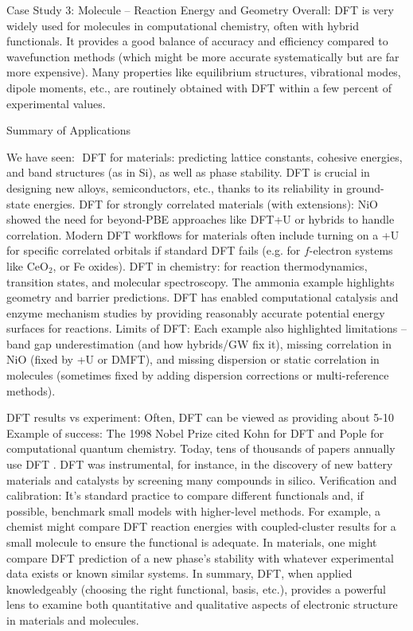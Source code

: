 \begin{frame}{Case Study 3: Molecule – Reaction Energy and Geometry}
Overall: DFT is very widely used for molecules in computational chemistry, often with hybrid functionals. It provides a good balance of accuracy and efficiency compared to wavefunction methods (which might be more accurate systematically but are far more expensive). Many properties like equilibrium structures, vibrational modes, dipole moments, etc., are routinely obtained with DFT within a few percent of experimental values. \end{frame}


\begin{frame}{Summary of Applications}

We have seen: 
DFT for materials: predicting lattice constants, cohesive energies, and band structures (as in Si), as well as phase stability. DFT is crucial in designing new alloys, semiconductors, etc., thanks to its reliability in ground-state energies.
DFT for strongly correlated materials (with extensions): NiO showed the need for beyond-PBE approaches like DFT+U or hybrids to handle correlation. Modern DFT workflows for materials often include turning on a +U for specific correlated orbitals if standard DFT fails (e.g. for $f$-electron systems like CeO$_2$, or Fe oxides).
DFT in chemistry: for reaction thermodynamics, transition states, and molecular spectroscopy. The ammonia example highlights geometry and barrier predictions. DFT has enabled computational catalysis and enzyme mechanism studies by providing reasonably accurate potential energy surfaces for reactions.
Limits of DFT: Each example also highlighted limitations – band gap underestimation (and how hybrids/GW fix it), missing correlation in NiO (fixed by +U or DMFT), and missing dispersion or static correlation in molecules (sometimes fixed by adding dispersion corrections or multi-reference methods).

DFT results vs experiment: Often, DFT can be viewed as providing about 5-10%
Example of success: The 1998 Nobel Prize cited Kohn for DFT and Pople for computational quantum chemistry. Today, tens of thousands of papers annually use DFT . DFT was instrumental, for instance, in the discovery of new battery materials  and catalysts by screening many compounds in silico.
Verification and calibration: It’s standard practice to compare different functionals and, if possible, benchmark small models with higher-level methods. For example, a chemist might compare DFT reaction energies with coupled-cluster results for a small molecule to ensure the functional is adequate. In materials, one might compare DFT prediction of a new phase’s stability with whatever experimental data exists or known similar systems.
In summary, DFT, when applied knowledgeably (choosing the right functional, basis, etc.), provides a powerful lens to examine both quantitative and qualitative aspects of electronic structure in materials and molecules. \end{frame}


